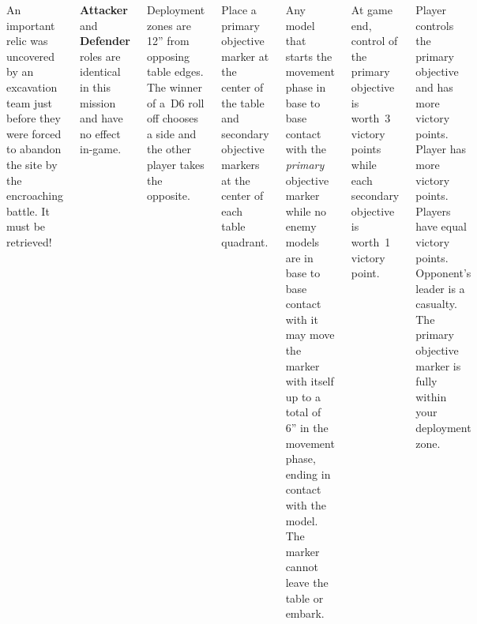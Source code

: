 
\begin{columns}

  An important relic was uncovered by an excavation team just before
  they were forced to abandon the site by the encroaching battle.  It
  must be retrieved!

  \textbf{Attacker} and \textbf{Defender} roles are identical in this
  mission and have no effect in-game.

%

Deployment zones are 12'' from opposing table edges.  The winner of
a~D6 roll off chooses a side and the other player takes the opposite.

Place a primary objective marker at the center of the table and
secondary objective markers at the center of each table quadrant.


%

Any model that starts the movement phase in base to base contact with
the \emph{primary} objective marker while no enemy models are in base
to base contact with it may move the marker with itself up to a total
of 6'' in the movement phase, ending in contact with the model.  The
marker cannot leave the table or embark.


At game end, control of the primary objective is worth~3 victory
points while each secondary objective is worth~1 victory point.

\scoringbox%
{Player controls the primary objective and has more victory points.}%
{Player has more victory points.}%
{Players have equal victory points.}%
{Opponent's leader is a casualty.}%
{The primary objective marker is fully within your deployment zone.}

\end{columns}

